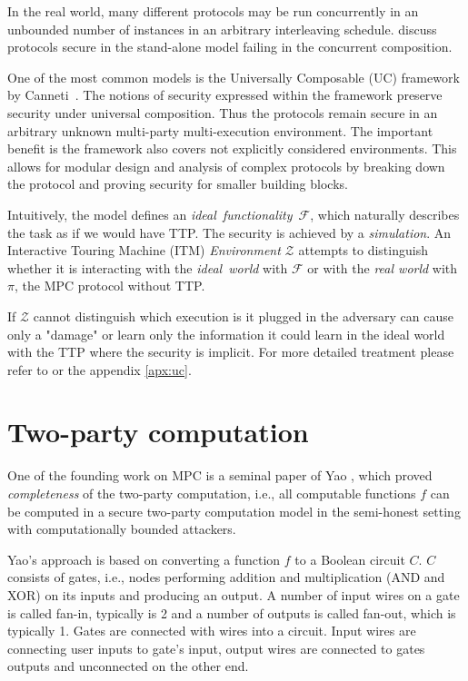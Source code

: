 \documentclass[
  digital, %
  twoside, %
  table,   %
  lof,     %
  lot,     %
]{fithesis3}
\theoremstyle{definition}
\theoremstyle{remark}
\begin{document}
In the real world, many different protocols may be run concurrently in an unbounded number of instances in an arbitrary interleaving schedule. \cite{Can06, Can13} discuss protocols secure in the stand-alone model failing in the concurrent composition.

One of the most common models is the Universally Composable (UC) framework by Canneti~\cite{Can01}. The notions of security expressed within the framework preserve security under universal composition. Thus the protocols remain secure in an arbitrary unknown multi-party multi-execution environment. The important benefit is the framework also covers not explicitly considered environments. This allows for modular design and analysis of complex protocols by breaking down the protocol and proving security for smaller building blocks.

Intuitively, the model defines an \emph{ideal~functionality}~$\mathcal{F}$, which naturally describes the task as if we would have TTP. The security is achieved by a \emph{simulation}. An Interactive Touring Machine (ITM) \emph{Environment} $\mathcal{Z}$ attempts to distinguish whether it is interacting with the \emph{ideal~world} with $\mathcal{F}$ or with the \emph{real world} with $\pi$, the MPC protocol without TTP. 

If $\mathcal{Z}$ cannot distinguish which execution is it plugged in the adversary can cause only a "damage" or learn only the information it could learn in the ideal world with the TTP where the security is implicit. For more detailed treatment please refer to \cite{Can01, CLOS02, Lin03, G09, CDN15, Lin17} or the appendix \ref{apx:uc}.

\section{Two-party computation}\label{sec:soa:2pc} %
One of the founding work on MPC is a seminal paper of Yao \cite{Yao86}, which proved \emph{completeness} of the two-party computation, i.e., all computable functions $f$ can be computed in a secure two-party computation model in the semi-honest setting with computationally bounded attackers. 

Yao's approach is based on converting a function $f$ to a Boolean circuit $C$. $C$ consists of gates, i.e., nodes performing addition and multiplication (AND and XOR) on its inputs and producing an output. A number of input wires on a gate is called fan-in, typically is 2 and a number of outputs is called fan-out, which is typically 1. Gates are connected with wires into a circuit. Input wires are connecting user inputs to gate's input, output wires are connected to gates outputs and unconnected on the other end.
\end{document}
